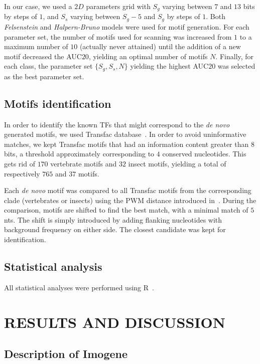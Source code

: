 \documentclass[a4,center,fleqn]{NAR}
\begin{document}
In our case, we used a $2D$ parameters grid with $S_g$ varying between $7$ and
$13$ bits by steps of $1$, and $S_s$ varying between $S_g-5$ and $S_g$ by steps
of $1$.
Both {\em Felsenstein} and {\em Halpern-Bruno} models were used for motif
generation. 
For each parameter set, the number of motifs used for scanning was increased
from $1$ to a maximum number of $10$ (actually never attained) until the
addition of a new motif decreased the AUC$20$, yielding an optimal number of
motifs $N$.
Finally, for each class, the parameter set $\{S_g, S_s, N\}$ yielding the
highest AUC$20$ was selected as the best parameter set.








\subsection*{Motifs identification} 

In order to identify the known TFs that might correspond to the \textit{de
novo} generated motifs, we used Transfac database~\cite{Matys:2006gf}.
In order to avoid uninformative matches, we kept Transfac motifs that had an
information content greater than $8$ bits, a threshold approximately
corresponding to $4$ conserved nucleotides.
This gets rid of $170$ vertebrate motifs and $32$ insect motifs, yielding
a total of respectively $765$ and $37$ motifs.
 
Each \textit{de novo} motif was compared to all Transfac motifs from the
corresponding clade (vertebrates or insects) using the PWM distance introduced
in~\cite{Rouault:2010fk}.
During the comparison, motifs are shifted to find the best match, with
a minimal match of $5$ nts.
The shift is simply introduced by adding flanking nucleotides with background
frequency on either side.
The closest candidate was kept for identification.


\subsection*{Statistical analysis}

All statistical analyses were performed using R~\cite{Rstat}.

\section{RESULTS AND DISCUSSION}

\subsection*{Description of Imogene}
\label{imdesc}
\end{document}
